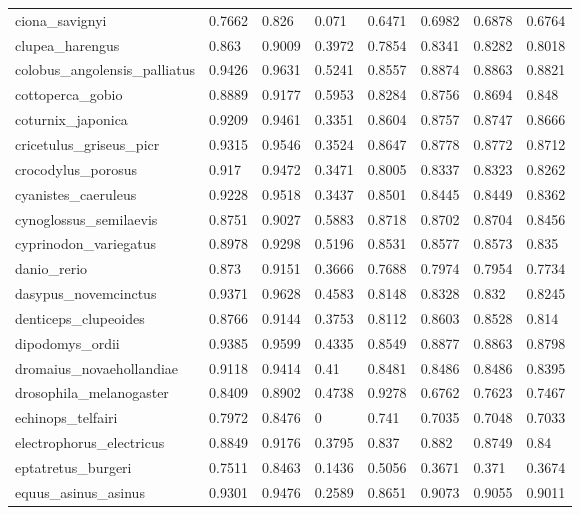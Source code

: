 \documentclass{article}
\begin{document}
\begin{table}[!h]
{\begin{tabular}{@{}llllllll@{}}
ciona\_savignyi & 0.7662 & 0.826 & 0.071 & 0.6471 & 0.6982 & 0.6878 & 0.6764 \\
clupea\_harengus & 0.863 & 0.9009 & 0.3972 & 0.7854 & 0.8341 & 0.8282 & 0.8018 \\
colobus\_angolensis\_palliatus & 0.9426 & 0.9631 & 0.5241 & 0.8557 & 0.8874 & 0.8863 & 0.8821 \\
cottoperca\_gobio & 0.8889 & 0.9177 & 0.5953 & 0.8284 & 0.8756 & 0.8694 & 0.848 \\
coturnix\_japonica & 0.9209 & 0.9461 & 0.3351 & 0.8604 & 0.8757 & 0.8747 & 0.8666 \\
cricetulus\_griseus\_picr & 0.9315 & 0.9546 & 0.3524 & 0.8647 & 0.8778 & 0.8772 & 0.8712 \\
crocodylus\_porosus & 0.917 & 0.9472 & 0.3471 & 0.8005 & 0.8337 & 0.8323 & 0.8262 \\
cyanistes\_caeruleus & 0.9228 & 0.9518 & 0.3437 & 0.8501 & 0.8445 & 0.8449 & 0.8362 \\
cynoglossus\_semilaevis & 0.8751 & 0.9027 & 0.5883 & 0.8718 & 0.8702 & 0.8704 & 0.8456 \\
cyprinodon\_variegatus & 0.8978 & 0.9298 & 0.5196 & 0.8531 & 0.8577 & 0.8573 & 0.835 \\
danio\_rerio & 0.873 & 0.9151 & 0.3666 & 0.7688 & 0.7974 & 0.7954 & 0.7734 \\
dasypus\_novemcinctus & 0.9371 & 0.9628 & 0.4583 & 0.8148 & 0.8328 & 0.832 & 0.8245 \\
denticeps\_clupeoides & 0.8766 & 0.9144 & 0.3753 & 0.8112 & 0.8603 & 0.8528 & 0.814 \\
dipodomys\_ordii & 0.9385 & 0.9599 & 0.4335 & 0.8549 & 0.8877 & 0.8863 & 0.8798 \\
dromaius\_novaehollandiae & 0.9118 & 0.9414 & 0.41 & 0.8481 & 0.8486 & 0.8486 & 0.8395 \\
drosophila\_melanogaster & 0.8409 & 0.8902 & 0.4738 & 0.9278 & 0.6762 & 0.7623 & 0.7467 \\
echinops\_telfairi & 0.7972 & 0.8476 & 0 & 0.741 & 0.7035 & 0.7048 & 0.7033 \\
electrophorus\_electricus & 0.8849 & 0.9176 & 0.3795 & 0.837 & 0.882 & 0.8749 & 0.84 \\
eptatretus\_burgeri & 0.7511 & 0.8463 & 0.1436 & 0.5056 & 0.3671 & 0.371 & 0.3674 \\
equus\_asinus\_asinus & 0.9301 & 0.9476 & 0.2589 & 0.8651 & 0.9073 & 0.9055 & 0.9011 \\
\hline
\end{tabular}}
\end{table}
\end{document}
